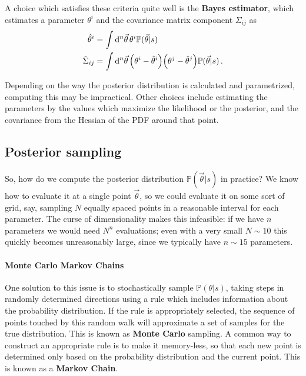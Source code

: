 \documentclass[main.tex]{subfiles}
\begin{document}
A choice which satisfies these criteria quite well is the \textbf{Bayes estimator}, which estimates a parameter \(\theta^{i}\) and the covariance matrix component \(\Sigma_{ij}\) as 
%
\begin{align}
\hat{\theta}^{i} &= \int \dd[n]{\vec{\theta} } \theta^{i}\mathbb{P}(\vec{\theta} | s)  \\
\hat{\Sigma}_{ij} &= \int \dd[n]{\vec{\theta}} 
\qty(\theta^{i}  - \hat{\theta}^{i})
\qty(\theta^{j}  - \hat{\theta}^{j}) 
\mathbb{P}(\vec{\theta} | s)
\,.
\end{align}


Depending on the way the posterior distribution is calculated and parametrized, computing this may be impractical.
Other choices include estimating the parameters by the values which maximize the likelihood or the posterior, and the covariance from the Hessian of the \ac{PDF} around that point. 

\subsection{Posterior sampling}

So, how do we compute the posterior distribution \(\mathbb{P}(\vec{\theta} | s)\) in practice? We know how to evaluate it at a single point \(\vec{\theta}\), so we could evaluate it on some sort of grid, say, sampling \(N\) equally spaced points in a reasonable interval for each parameter.
The curse of dimensionality makes this infeasible: if we have \(n\) parameters we would need \(N^{n}\) evaluations; even with a very small \(N \sim 10\) this quickly becomes unreasonably large, since we typically have \(n \sim 15\) parameters. 

\paragraph{Monte Carlo Markov Chains}

One solution to this issue is to stochastically sample \(\mathbb{P}(\theta | s)\), taking steps in randomly determined directions using a rule which includes information about the probability distribution. 
If the rule is appropriately selected, the sequence of points touched by this random walk will approximate a set of samples for the true distribution. This is known as \textbf{Monte Carlo} sampling. 
A common way to construct an appropriate rule is to make it memory-less, so that each new point is determined only based on the probability distribution and the current point. This is known as a \textbf{Markov Chain}. 
\end{document}
